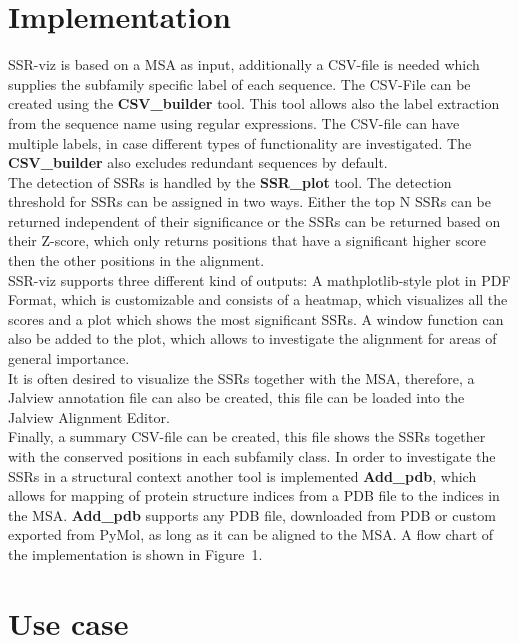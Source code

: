 \documentclass{bioinfo}
\begin{document}
\section{Implementation}
%
SSR-viz is based on a MSA as input, additionally a CSV-file is needed which supplies the 
subfamily specific label of each sequence. The CSV-File can be created using the
\textbf{CSV\_builder} tool. This tool allows also the label extraction from
the sequence name using regular expressions.
The CSV-file can have multiple labels, in case different types of functionality 
are investigated. The \textbf{CSV\_builder} also excludes redundant sequences by default.\\
%
The detection of SSRs is handled by the \textbf{SSR\_plot} tool. 
The detection threshold for SSRs can be assigned in two ways. Either the top N 
SSRs can be returned independent of their significance or the SSRs can be returned based
on their Z-score, which only returns positions that have a significant higher score then 
the other positions in the alignment. \\
%
SSR-viz supports three different kind of outputs:
A mathplotlib-style plot in PDF Format, which is customizable and consists
of a heatmap, which visualizes all the scores and a plot which shows the most 
significant SSRs. A window function can also be added to the plot, which allows 
to investigate the alignment for areas of general importance. \\
%
It is often desired to visualize the SSRs together with the MSA, therefore,
a Jalview annotation file can also be created, this file can be loaded into 
the Jalview Alignment Editor.\\
%
Finally, a summary CSV-file can be created, this file shows the SSRs
together with the conserved positions in each subfamily class. 
In order to investigate the SSRs in a structural context
another tool is implemented \textbf{Add\_pdb}, which allows for 
mapping of protein structure indices from a PDB file to the indices in the MSA.
\textbf{Add\_pdb} supports any PDB file, downloaded from PDB or custom exported from 
PyMol, as long as it can be aligned to the MSA.
A flow chart of the implementation is shown in Figure~1\vphantom{\ref{fig:01}}.


\section{Use case}
\end{document}
